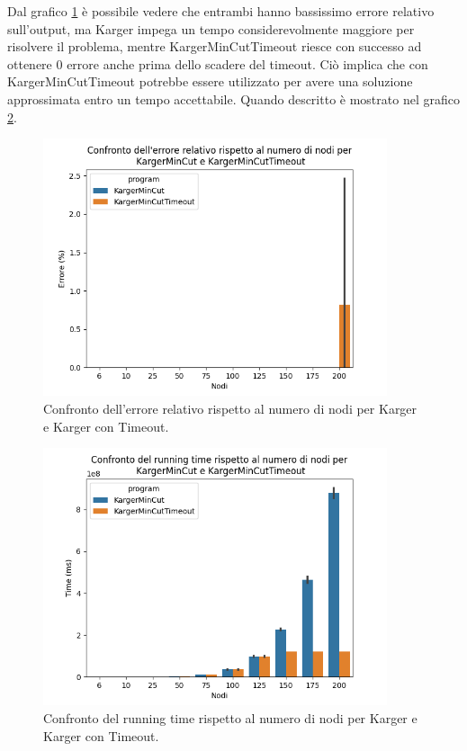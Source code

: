 \noindent Dal grafico \ref{fig:karger-vs-kargertout-error-chart} è
possibile vedere che entrambi hanno bassissimo errore relativo
sull'output, ma Karger impega un tempo considerevolmente maggiore per
risolvere il problema, mentre KargerMinCutTimeout riesce con successo ad
ottenere $0$ errore anche prima dello scadere del timeout. Ciò implica
che con KargerMinCutTimeout potrebbe essere utilizzato per avere una
soluzione approssimata entro un tempo accettabile. Quando descritto è
mostrato nel grafico \ref{fig:karger-vs-kargertout-runtime-chart}.

\begin{figure}[H]
    \centering

    \includegraphics[width=0.9\textwidth]{./images/Confronto_dell'errore_relativo_rispetto_al_numero_di_nodi_per__KargerMinCut_e_KargerMinCutTimeout.png}

    \caption{Confronto dell'errore relativo rispetto al numero di nodi per Karger e Karger con Timeout.}
    \label{fig:karger-vs-kargertout-error-chart}
\end{figure}

\begin{figure}[H]
    \centering

    \includegraphics[width=0.9\textwidth]{./images/Confronto_del_running_time_rispetto_al_numero_di_nodi_per__KargerMinCut_e_KargerMinCutTimeout.png}

    \caption{Confronto del running time rispetto al numero di nodi per Karger e Karger con Timeout.}
    \label{fig:karger-vs-kargertout-runtime-chart}
\end{figure}
